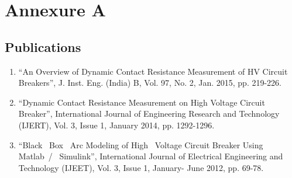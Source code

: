 
\chapter*{Annexure A}

\clearpage

\section*{Publications}
\begin{enumerate}
\item \textquotedblleft An Overview of Dynamic Contact Resistance Measurement of HV Circuit Breakers\textquotedblright, J. Inst. Eng. (India) B, Vol. 97, No. 2, Jan. 2015, pp. 219-226.
\item \textquotedblleft Dynamic Contact Resistance Measurement on High Voltage Circuit Breaker\textquotedblright, International Journal of Engineering Research and Technology (IJERT), Vol. 3, Issue 1, January 2014, pp. 1292-1296.
\item \textquotedblleft Black ~Box ~Arc Modeling of High ~Voltage Circuit Breaker Using Matlab~/ ~Simulink\textquotedblright, International Journal of Electrical Engineering and Technology (IJEET), Vol. 3, Issue 1, January- June 2012, pp. 69-78. 
\end{enumerate}
\clearpage



\clearpage

